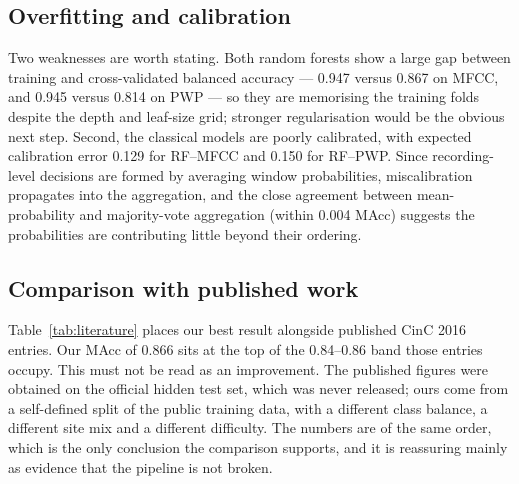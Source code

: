 \subsection{Overfitting and calibration}

Two weaknesses are worth stating. Both random forests show a large gap between
training and cross-validated balanced accuracy --- \num{0.947} versus
\num{0.867} on MFCC, and \num{0.945} versus \num{0.814} on PWP --- so they are
memorising the training folds despite the depth and leaf-size grid; stronger
regularisation would be the obvious next step. Second, the classical models are
poorly calibrated, with expected calibration error \num{0.129} for RF--MFCC and
\num{0.150} for RF--PWP. Since recording-level decisions are formed by averaging
window probabilities, miscalibration propagates into the aggregation, and the
close agreement between mean-probability and majority-vote aggregation
(within \num{0.004} MAcc) suggests the probabilities are contributing little
beyond their ordering.

\subsection{Comparison with published work}



Table~\ref{tab:literature} places our best result alongside published CinC 2016
entries. Our MAcc of \num{0.866} sits at the top of the \num{0.84}--\num{0.86}
band those entries occupy. This must not be read as an improvement. The published
figures were obtained on the official hidden test set, which was never released;
ours come from a self-defined split of the public training data, with a
different class balance, a different site mix and a different difficulty. The
numbers are of the same order, which is the only conclusion the comparison
supports, and it is reassuring mainly as evidence that the pipeline is not
broken.
